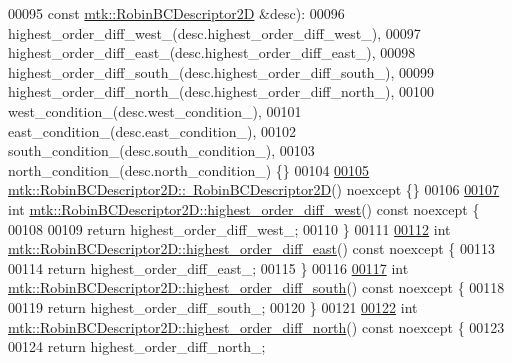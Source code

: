 \begin{DoxyCode}
00095     \textcolor{keyword}{const} \hyperlink{classmtk_1_1RobinBCDescriptor2D}{mtk::RobinBCDescriptor2D} &desc):
00096   highest\_order\_diff\_west\_(desc.highest\_order\_diff\_west\_),
00097   highest\_order\_diff\_east\_(desc.highest\_order\_diff\_east\_),
00098   highest\_order\_diff\_south\_(desc.highest\_order\_diff\_south\_),
00099   highest\_order\_diff\_north\_(desc.highest\_order\_diff\_north\_),
00100   west\_condition\_(desc.west\_condition\_),
00101   east\_condition\_(desc.east\_condition\_),
00102   south\_condition\_(desc.south\_condition\_),
00103   north\_condition\_(desc.north\_condition\_) \{\}
00104 
\hypertarget{mtk__robin__bc__descriptor__2d_8cc_source_l00105}{}\hyperlink{classmtk_1_1RobinBCDescriptor2D_a75351b00a9e306f468d1733ce38dff5f}{00105} \hyperlink{classmtk_1_1RobinBCDescriptor2D_a75351b00a9e306f468d1733ce38dff5f}{mtk::RobinBCDescriptor2D::~RobinBCDescriptor2D}() noexcept \{\}
00106 
\hypertarget{mtk__robin__bc__descriptor__2d_8cc_source_l00107}{}\hyperlink{classmtk_1_1RobinBCDescriptor2D_ac75fc5f402e3f6e6d4f1e253f8ada98c}{00107} \textcolor{keywordtype}{int} \hyperlink{classmtk_1_1RobinBCDescriptor2D_ac75fc5f402e3f6e6d4f1e253f8ada98c}{mtk::RobinBCDescriptor2D::highest\_order\_diff\_west}() 
      const noexcept \{
00108 
00109   \textcolor{keywordflow}{return} highest\_order\_diff\_west\_;
00110 \}
00111 
\hypertarget{mtk__robin__bc__descriptor__2d_8cc_source_l00112}{}\hyperlink{classmtk_1_1RobinBCDescriptor2D_aebe62f9ae39b02f9c029257d6e6381af}{00112} \textcolor{keywordtype}{int} \hyperlink{classmtk_1_1RobinBCDescriptor2D_aebe62f9ae39b02f9c029257d6e6381af}{mtk::RobinBCDescriptor2D::highest\_order\_diff\_east}() 
      const noexcept \{
00113 
00114   \textcolor{keywordflow}{return} highest\_order\_diff\_east\_;
00115 \}
00116 
\hypertarget{mtk__robin__bc__descriptor__2d_8cc_source_l00117}{}\hyperlink{classmtk_1_1RobinBCDescriptor2D_a6aaa1f5a3dc46446acd66209f1519410}{00117} \textcolor{keywordtype}{int} \hyperlink{classmtk_1_1RobinBCDescriptor2D_a6aaa1f5a3dc46446acd66209f1519410}{mtk::RobinBCDescriptor2D::highest\_order\_diff\_south}() 
      const noexcept \{
00118 
00119   \textcolor{keywordflow}{return} highest\_order\_diff\_south\_;
00120 \}
00121 
\hypertarget{mtk__robin__bc__descriptor__2d_8cc_source_l00122}{}\hyperlink{classmtk_1_1RobinBCDescriptor2D_a77d5d6b65f39bc74072fbc1d638eb899}{00122} \textcolor{keywordtype}{int} \hyperlink{classmtk_1_1RobinBCDescriptor2D_a77d5d6b65f39bc74072fbc1d638eb899}{mtk::RobinBCDescriptor2D::highest\_order\_diff\_north}() 
      const noexcept \{
00123 
00124   \textcolor{keywordflow}{return} highest\_order\_diff\_north\_;

\end{DoxyCode}

